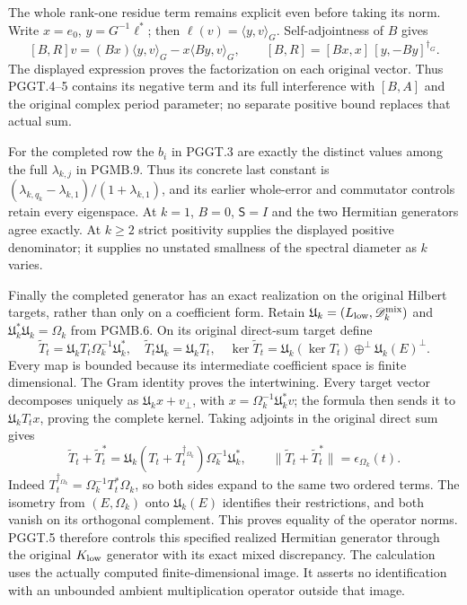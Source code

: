 The whole rank-one residue term remains explicit even
before taking its norm. Write $x=e_0$,
$y=G^{-1}\ell^*$; then $\ell(v)=\langle y,v\rangle_G$.
Self-adjointness of $B$ gives
\[
 [B,R]v=(Bx)\langle y,v\rangle_G
               -x\langle By,v\rangle_G,
 \qquad [B,R]=[Bx,x]\,[y,-By]^{\dagger_G}.
 \tag{PGGT.6}\label{GraphV2:eq:pggt-residue-sign}
\]
The displayed expression proves the factorization on each
original vector. Thus PGGT.4--5 contains its negative
term and its full interference with $[B,A]$ and the
original complex period parameter; no separate positive
bound replaces that actual sum.

For the completed row the $b_i$ in PGGT.3 are exactly the
distinct values among the full $\lambda_{k,j}$ in
PGMB.9. Thus its concrete last constant is
$(\lambda_{k,q_k}-\lambda_{k,1})/(1+\lambda_{k,1})$,
and its earlier whole-error and commutator controls retain
every eigenspace. At $k=1$, $B=0$, $\mathsf S=I$ and
the two Hermitian generators agree exactly. At $k\geq2$
strict positivity supplies the displayed positive
denominator; it supplies no unstated smallness of the
spectral diameter as $k$ varies.

Finally the completed generator has an exact realization
on the original Hilbert targets, rather than only on a
coefficient form. Retain
$\mathfrak U_k=(L_{\rm low},\mathscr D_k^{\rm mix})$
and $\mathfrak U_k^*\mathfrak U_k=\Omega_k$ from PGMB.6.
On its original direct-sum target define
\[
 \widetilde T_t=\mathfrak U_kT_t\Omega_k^{-1}\mathfrak U_k^*,
 \quad\widetilde T_t\mathfrak U_k=\mathfrak U_kT_t,
 \quad\ker\widetilde T_t
 =\mathfrak U_k(\ker T_t)\mathbin{\oplus^\perp}
                                  \mathfrak U_k(E)^\perp.
 \tag{PGGT.7}\label{GraphV2:eq:pggt-realized-generator}
\]
Every map is bounded because its intermediate coefficient
space is finite dimensional. The Gram identity proves
the intertwining. Every target vector decomposes uniquely
as $\mathfrak U_kx+v_\perp$, with $x=\Omega_k^{-1}
\mathfrak U_k^*v$; the formula then sends it to
$\mathfrak U_kT_tx$, proving the complete kernel.
Taking adjoints in the original direct sum gives
\[
 \widetilde T_t+\widetilde T_t^*
 =\mathfrak U_k(T_t+T_t^{\dagger_{\Omega_k}})
                                      \Omega_k^{-1}\mathfrak U_k^*,
 \qquad
 \|\widetilde T_t+\widetilde T_t^*\|
                           =\epsilon_{\Omega_k}(t).
 \tag{PGGT.8}\label{GraphV2:eq:pggt-realized-hermitian-control}
\]
Indeed $T_t^{\dagger_{\Omega_k}}=\Omega_k^{-1}T_t^*\Omega_k$,
so both sides expand to the same two ordered terms. The
isometry from $(E,\Omega_k)$ onto $\mathfrak U_k(E)$
identifies their restrictions, and both vanish on its
orthogonal complement. This proves equality of the
operator norms. PGGT.5 therefore controls this specified
realized Hermitian generator through the original
$K_{\rm low}$ generator with its exact mixed discrepancy.
The calculation uses the actually computed finite-dimensional
image. It asserts no identification with an unbounded
ambient multiplication operator outside that image.
